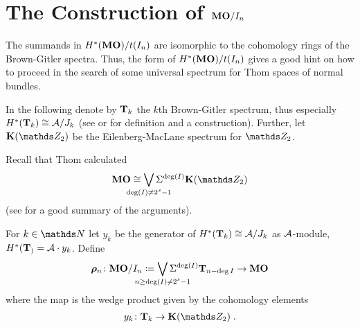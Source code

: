 \section*{The Construction of $\bm{\mathrm{MO}}/I_{n}$}
The summands in $H^*(\bm{\mathrm{MO}})/t(I_{n})$ are isomorphic to the
cohomology rings of the Brown-Gitler spectra.
Thus, the form of $H^*(\bm{\mathrm{MO}})/t(I_{n})$ gives a good hint on how
to proceed in the search of some universal spectrum for Thom spaces of
normal bundles.

\begin{Not*}
  In the following denote by $\bm{\mathrm{T}}{}_{k}$ the $k$th Brown-Gitler
  spectrum, thus especially $H^*(\bm{\mathrm{T}}{}_{k}) \cong \mathcal{A}/J_{k}$
  (see \cite{browngitler} or \cite[p.~101]{immersionconj} for
  definition and a construction).
  Further, let $\EMspec$ be the Eilenberg-MacLane spectrum for
  $\Zmod2$.
\end{Not*}

\begin{Rem*}
  Recall that Thom calculated
  \begin{gather*}
    \MOspec
    \cong \bigvee_{\mathclap{\deg(I)\neq 2^s-1}}
    \susp^{\deg(I)} \EMspec
  \end{gather*}
  (see \cite[p.~81f]{immersionconj} for a good summary of the arguments).
\end{Rem*}

\begin{Def*}
  For $k\in\Nat$ let $y_k$ be the generator of
  $H^*(\bm{\mathrm{T}}{}_{k})\cong \mathcal{A}/J_{k}$ as $\mathcal{A}$-module,
  \idest $H^*(\bm{\mathrm{T}}{}_{)}=\mathcal{A}\cdot y_k$.
  Define
  \begin{gather*}
    \bm{\rho}_n\colon
    \MOmodI n
    \coloneqq \bigvee_{\mathclap{n\geq\deg(I)\neq 2^s-1}}
    \susp^{\deg(I)} \BrownGitler{n-\deg{I}}
    \to \MOspec
  \end{gather*}
  where the map is the wedge product given by the cohomology elements
  \begin{gather*}
    y_k\colon\BrownGitler k \to \EMspec
    \;.
  \end{gather*}
\end{Def*}

